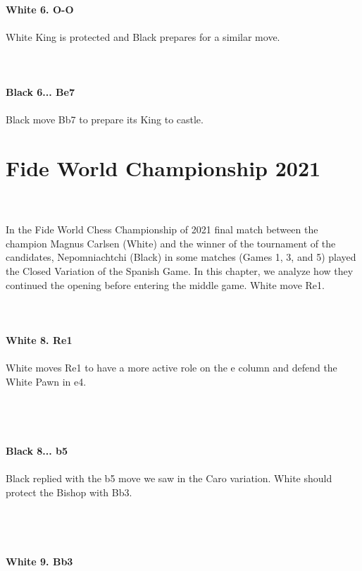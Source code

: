 \documentclass{article}
\begin{document}
\\
\textbf{White 6. O-O}\\
\\
White King is protected and Black prepares for a similar move.\\
\\

\\
\\
\textbf{Black 6... Be7}\\
\\
Black move Bb7 to prepare its King to castle.\section{ Fide World Championship 2021}

\\
\\
In the Fide World Chess Championship of 2021 final match between the champion Magnus Carlsen (White) and the winner of the tournament of the candidates, Nepomniachtchi (Black) in some matches (Games 1, 3, and 5) played the Closed Variation of the Spanish Game. In this chapter, we analyze how they continued the opening before entering the middle game. White move Re1.\\
\\

\\
\\
\textbf{White 8. Re1}\\
\\
White moves Re1 to have a more active role on the e column and defend the White Pawn in e4.\\\\
\\

\\
\\
\textbf{Black 8... b5}\\
\\
Black replied with the b5 move we saw in the Caro variation. White should protect the Bishop with Bb3.\\\\
\\

\\
\\
\textbf{White 9. Bb3}\\
\\
\end{document}
